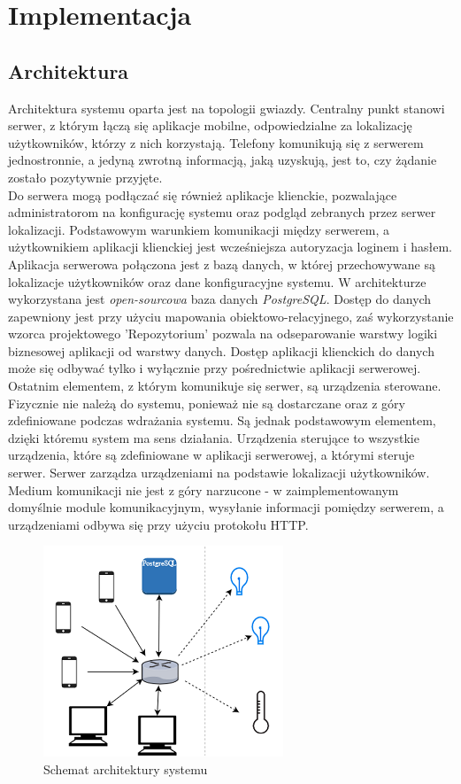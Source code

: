 \chapter{Implementacja}
\label{cha:implementacja}
\section{Architektura}
Architektura systemu oparta jest na topologii gwiazdy. Centralny punkt stanowi serwer, z którym łączą się aplikacje mobilne, odpowiedzialne za lokalizację użytkowników, którzy z nich korzystają. Telefony komunikują się z serwerem jednostronnie, a jedyną zwrotną informacją, jaką uzyskują, jest to, czy żądanie zostało pozytywnie przyjęte.\\
Do serwera mogą podłączać się również aplikacje klienckie, pozwalające administratorom na konfigurację systemu oraz podgląd zebranych przez serwer lokalizacji. Podstawowym warunkiem komunikacji między serwerem, a użytkownikiem aplikacji klienckiej jest wcześniejsza autoryzacja loginem i hasłem.\\
Aplikacja serwerowa połączona jest z bazą danych, w której przechowywane są lokalizacje użytkowników oraz dane konfiguracyjne systemu. W architekturze wykorzystana jest \textit{open-sourcowa} baza danych \textit{PostgreSQL}. Dostęp do danych zapewniony jest przy użyciu mapowania obiektowo-relacyjnego, zaś wykorzystanie wzorca projektowego 'Repozytorium' pozwala na odseparowanie warstwy logiki biznesowej aplikacji od warstwy danych. Dostęp aplikacji klienckich do danych może się odbywać tylko i wyłącznie przy pośrednictwie aplikacji serwerowej.\\
Ostatnim elementem, z którym komunikuje się serwer, są urządzenia sterowane. Fizycznie nie należą do systemu, ponieważ nie są dostarczane oraz z góry zdefiniowane podczas wdrażania systemu. Są jednak podstawowym elementem, dzięki któremu system ma sens działania. Urządzenia sterujące to wszystkie urządzenia, które są zdefiniowane w aplikacji serwerowej, a którymi steruje serwer. Serwer zarządza urządzeniami na podstawie lokalizacji użytkowników. Medium komunikacji nie jest z góry narzucone - w zaimplementowanym domyślnie module komunikacyjnym, wysyłanie informacji pomiędzy serwerem, a urządzeniami odbywa się przy użyciu protokołu HTTP.
\begin{figure}[H]			
	\centering
	\caption{Schemat architektury systemu}
	\includegraphics{schemat_architektury}
\end{figure}
